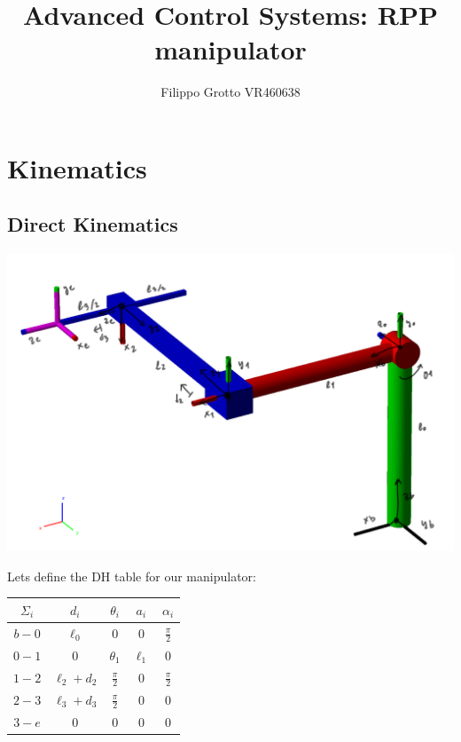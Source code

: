 \documentclass[a4paper,12pt]{article}
\renewcommand*{\t}{\theta}
\renewcommand*{\l}{\ell}
\begin{document}
\author{Filippo Grotto VR460638}

\title{Advanced Control Systems: RPP manipulator}

\maketitle
\tableofcontents

\section{Kinematics}

\subsection{Direct Kinematics}

\begin{center}
\includegraphics[scale=0.40,trim={10, 10, 10, 10},clip]{images/robot.png}
\end{center}

\noindent Lets define the DH table for our manipulator:

\begin{center}
\begin{tabular}{|c|c|c|c|c|}
    \hline
    $\Sigma_i$ & $d_i$ & $\theta_i$ & $a_i$ & $\alpha_i$ \\ 
    \hline
    $b-0$ & $\l_0$ &    $0$ &    $0$    & $\frac{\pi}{2}$ \\
    $0-1$ &    $0$    & $\t_1$ & $\l_1$ &        $0$ \\
    $1-2$ &    $\l_2+d_2$    & $\frac{\pi}{2}$ & $0$ &        $\frac{\pi}{2}$ \\
    $2-3$ &    $\l_3+d_3$ &    $\frac{\pi}{2}$ &    $0$    &        $0$ \\
    $3-e$ &    $0$    &    $0$ &    $0$    &        $0$ \\
    \hline
\end{tabular}
\end{center}
\end{document}
